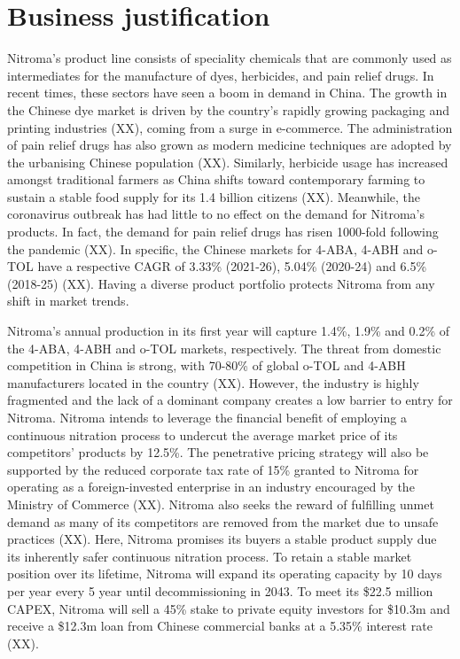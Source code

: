 \section*{Business justification}

Nitroma’s product line consists of speciality chemicals that are commonly used as intermediates for the manufacture of dyes, herbicides, and pain relief drugs. In recent times, these sectors have seen a boom in demand in China. The growth in the Chinese dye market is driven by the country’s rapidly growing packaging and printing industries (XX), coming from a surge in e-commerce. The administration of pain relief drugs has also grown as modern medicine techniques are adopted by the urbanising Chinese population (XX). Similarly, herbicide usage has increased amongst traditional farmers as China shifts toward contemporary farming to sustain a stable food supply for its 1.4 billion citizens (XX). Meanwhile, the coronavirus outbreak has had little to no effect on the demand for Nitroma’s products. In fact, the demand for pain relief drugs has risen 1000-fold following the pandemic (XX). In specific, the Chinese markets for 4-ABA, 4-ABH and o-TOL have a respective CAGR of 3.33\% (2021-26), 5.04\% (2020-24) and 6.5\% (2018-25) (XX). Having a diverse product portfolio protects Nitroma from any shift in market trends.

Nitroma’s annual production in its first year will capture 1.4\%, 1.9\% and 0.2\% of the 4-ABA, 4-ABH and o-TOL markets, respectively. The threat from domestic competition in China is strong, with 70-80\% of global o-TOL and 4-ABH manufacturers located in the country (XX). However, the industry is highly fragmented and the lack of a dominant company creates a low barrier to entry for Nitroma. Nitroma intends to leverage the financial benefit of employing a continuous nitration process to undercut the average market price of its competitors’ products by 12.5\%.  The penetrative pricing strategy will also be supported by the reduced corporate tax rate of 15\% granted to Nitroma for operating as a foreign-invested enterprise in an industry encouraged by the Ministry of Commerce (XX). Nitroma also seeks the reward of fulfilling unmet demand as many of its competitors are removed from the market due to unsafe practices (XX). Here, Nitroma promises its buyers a stable product supply due its inherently safer continuous nitration process. To retain a stable market position over its lifetime, Nitroma will expand its operating capacity by 10 days per year every 5 year until decommissioning in 2043. To meet its \$22.5 million CAPEX, Nitroma will sell a 45\% stake to private equity investors for \$10.3m and receive a \$12.3m loan from Chinese commercial banks at a 5.35\% interest rate (XX).

